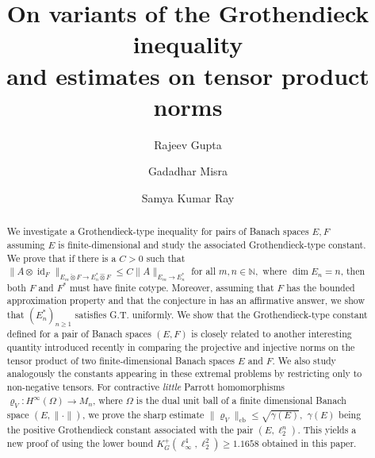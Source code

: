 \documentclass[a4paper,oneside,11pt, reqno]{amsart}
\title[Grothendieck and tensor product norms]{On variants of the Grothendieck inequality\\ and estimates on tensor product norms}
\author[Gupta]{Rajeev Gupta}
\author[Misra]{Gadadhar Misra}
\author[Ray]{Samya Kumar Ray}
\numberwithin{equation}{section}
\theoremstyle{plain}
\begin{document}
\baselineskip 14.125pt	
	\begin{abstract}
        We investigate a Grothendieck-type inequality for pairs of Banach spaces $E,F$ assuming $E$ is finite-dimensional and study the associated Grothendieck-type constant. We prove that if there is a $C >0$ such that  $\|A\otimes \operatorname{id}_{F}\|_{E_m\check{\otimes}F\to E_n^*\hat{\otimes}F}\leqslant C \|A\|_{E_m\to E_n^*}$ for all $m,n\in\mathbb{N},$ where $\dim E_n=n$, then both $F$ and $F^*$ must have finite cotype. Moreover, assuming that $F$ has the bounded approximation property and that the conjecture in \cite{PisierDuality} has an affirmative answer, we show that $(E_n^*)_{n\geqslant 1}$ satisfies G.T. uniformly. We show that the Grothendieck-type constant defined for a pair of Banach spaces $(E,F)$ is closely related to another interesting quantity introduced recently in \cite{XOR games and GT} comparing the projective and injective norms on the tensor product of two finite-dimensional Banach spaces $E$ and $F$. We also study  analogously the constants appearing in these extremal problems by restricting only to non-negative tensors. For contractive \emph{little} Parrott homomorphisms $\varrho_V : H^\infty(\Omega) \to M_{n}$, where $\Omega$ is the dual unit ball of a finite dimensional Banach space $(E,\|\cdot\|)$, we prove the sharp estimate
$
\|\varrho_V\|_{\mathrm{cb}}\leq\sqrt{\gamma(E)},
$
$\gamma(E)$ being the positive Grothendieck constant associated with the pair $(E, \ell^n_2)$. 
This yields a new proof of \cite[Theorem 2.1]{Davidchoi} using the lower bound $K_G^+(\ell_\infty^4,\ell_2^2) \geq 1.1658$ obtained in this paper. 
	\end{abstract}

\maketitle
\end{document}
